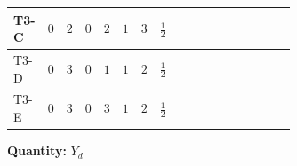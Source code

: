 \documentclass[8pt]{article}
\begin{document}
\begin{landscape}
\begin{longtable}{@{}llcccccc >{\raggedright\arraybackslash}p{0.21\linewidth} >{\raggedright\arraybackslash}p{0.21\linewidth} >{\raggedright\arraybackslash}p{0.21\linewidth}@{}}
\midrule
T3-C & $0$ & $2$ & $0$ & $2$ & $1$ & $3$ & $\frac{1}{2}$ & \scriptsize\adjustbox{max width=\linewidth}{$\begin{gathered} +\frac{3}{2} (\left({Y_d}\,\left({Y_d}\right)^{\dagger}\,{Y_d}\right)_{ij}-\left({Y_u}\,\left({Y_u}\right)^{\dagger}\,{Y_d}\right)_{ij})\end{gathered}$} & \scriptsize\adjustbox{max width=\linewidth}{$\begin{gathered} -\frac{9}{4} {g_2}^2 \left({Y_d}\right)_{ij}\end{gathered}$} & \scriptsize\adjustbox{max width=\linewidth}{$\begin{gathered} -8 {g_3}^2 \left({Y_d}\right)_{ij}\end{gathered}$} \\
\midrule
T3-D & $0$ & $3$ & $0$ & $1$ & $1$ & $2$ & $\frac{1}{2}$ & \scriptsize\adjustbox{max width=\linewidth}{$\begin{gathered} +\frac{3}{2} (\left({Y_d}\,\left({Y_d}\right)^{\dagger}\,{Y_d}\right)_{ij}-\left({Y_u}\,\left({Y_u}\right)^{\dagger}\,{Y_d}\right)_{ij})\end{gathered}$} & \scriptsize\adjustbox{max width=\linewidth}{$\begin{gathered} -\frac{9}{4} {g_2}^2 \left({Y_d}\right)_{ij}\end{gathered}$} & \scriptsize\adjustbox{max width=\linewidth}{$\begin{gathered} -8 {g_3}^2 \left({Y_d}\right)_{ij}\end{gathered}$} \\
\midrule
T3-E & $0$ & $3$ & $0$ & $3$ & $1$ & $2$ & $\frac{1}{2}$ & \scriptsize\adjustbox{max width=\linewidth}{$\begin{gathered} +\frac{3}{2} (\left({Y_d}\,\left({Y_d}\right)^{\dagger}\,{Y_d}\right)_{ij}-\left({Y_u}\,\left({Y_u}\right)^{\dagger}\,{Y_d}\right)_{ij})\end{gathered}$} & \scriptsize\adjustbox{max width=\linewidth}{$\begin{gathered} -\frac{9}{4} {g_2}^2 \left({Y_d}\right)_{ij}\end{gathered}$} & \scriptsize\adjustbox{max width=\linewidth}{$\begin{gathered} -8 {g_3}^2 \left({Y_d}\right)_{ij}\end{gathered}$} \\
\midrule
\bottomrule
\end{longtable}
\clearpage
\noindent\textbf{Quantity: }$Y_d$\par\smallskip

\end{landscape}
\end{document}
